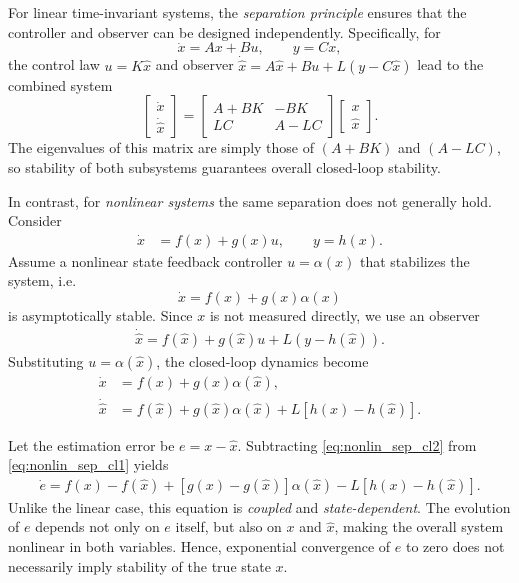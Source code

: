 For linear time-invariant systems, the \emph{separation principle} ensures that the controller and observer
can be designed independently.  
Specifically, for
\[
\dot{x} = A x + B u, \qquad y = Cx,
\]
the control law \(u = K\hat{x}\) and observer
\(\dot{\hat{x}} = A\hat{x} + Bu + L(y - C\hat{x})\)
lead to the combined system
\[
\begin{bmatrix}\dot{x}\\[2pt]\dot{\hat{x}}\end{bmatrix}
=
\begin{bmatrix}
A + BK & -BK \\[2pt]
LC & A - LC
\end{bmatrix}
\begin{bmatrix}x\\[2pt]\hat{x}\end{bmatrix}.
\]
The eigenvalues of this matrix are simply those of \((A+BK)\) and \((A-LC)\),
so stability of both subsystems guarantees overall closed-loop stability.

\medskip
\noindent In contrast, for \emph{nonlinear systems} the same separation does not generally hold.
Consider
\begin{align}
    \dot{x} &= f(x) + g(x)u, \qquad y = h(x). \label{eq:nonlin_sep_system}
\end{align}
Assume a nonlinear state feedback controller \(u = \alpha(x)\)
that stabilizes the system, i.e.
\[
\dot{x} = f(x) + g(x)\alpha(x)
\]
is asymptotically stable.
Since \(x\) is not measured directly, we use an observer
\begin{align}
    \dot{\hat{x}} = f(\hat{x}) + g(\hat{x})u + L(y - h(\hat{x})). \label{eq:nonlin_sep_obs}
\end{align}
Substituting \(u = \alpha(\hat{x})\), the closed-loop dynamics become
\begin{align}
    \dot{x} &= f(x) + g(x)\alpha(\hat{x}), \label{eq:nonlin_sep_cl1}\\
    \dot{\hat{x}} &= f(\hat{x}) + g(\hat{x})\alpha(\hat{x}) + L[h(x) - h(\hat{x})]. \label{eq:nonlin_sep_cl2}
\end{align}

\noindent Let the estimation error be \(e = x - \hat{x}\).  
Subtracting \eqref{eq:nonlin_sep_cl2} from \eqref{eq:nonlin_sep_cl1} yields
\begin{align}
    \dot{e} = f(x) - f(\hat{x}) + [g(x) - g(\hat{x})]\alpha(\hat{x}) - L[h(x) - h(\hat{x})]. \label{eq:nonlin_sep_error}
\end{align}
Unlike the linear case, this equation is \emph{coupled} and \emph{state-dependent}.
The evolution of \(e\) depends not only on \(e\) itself, but also on \(x\) and \(\hat{x}\),
making the overall system nonlinear in both variables.
Hence, exponential convergence of \(e\) to zero does not necessarily imply stability
of the true state \(x\).

